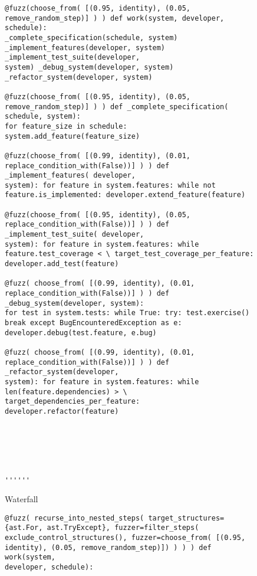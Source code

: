 \documentclass{sig-alternate}
\begin{document}
\begin{figure*}
  \centering
  
  \begin{subfigure}[b]{.45\linewidth}
\begin{lstlisting}[basicstyle=\ttfamily\scriptsize]
@fuzz(choose_from( [(0.95, identity), (0.05, remove_random_step)] ) ) def work(system, developer, schedule):
_complete_specification(schedule, system) _implement_features(developer, system) _implement_test_suite(developer,
system) _debug_system(developer, system) _refactor_system(developer, system)

@fuzz(choose_from( [(0.95, identity), (0.05, remove_random_step)] ) ) def _complete_specification( schedule, system):
for feature_size in schedule: system.add_feature(feature_size)

@fuzz(choose_from( [(0.99, identity), (0.01, replace_condition_with(False))] ) ) def _implement_features( developer,
system): for feature in system.features: while not feature.is_implemented: developer.extend_feature(feature)

@fuzz(choose_from( [(0.95, identity), (0.05, replace_condition_with(False))] ) ) def _implement_test_suite( developer,
system): for feature in system.features: while feature.test_coverage < \ target_test_coverage_per_feature:
developer.add_test(feature)

@fuzz( choose_from( [(0.99, identity), (0.01, replace_condition_with(False))] ) ) def _debug_system(developer, system):
for test in system.tests: while True: try: test.exercise() break except BugEncounteredException as e:
developer.debug(test.feature, e.bug)

@fuzz( choose_from( [(0.99, identity), (0.01, replace_condition_with(False))] ) ) def _refactor_system(developer,
system): for feature in system.features: while len(feature.dependencies) > \ target_dependencies_per_feature:
developer.refactor(feature)






''''''
\end{lstlisting}
    \caption{Waterfall}
  \end{subfigure}
  \hfill
  \begin{subfigure}[b]{.45\linewidth}
\begin{lstlisting}[basicstyle=\ttfamily\scriptsize]
@fuzz( recurse_into_nested_steps( target_structures={ast.For, ast.TryExcept}, fuzzer=filter_steps(
exclude_control_structures(), fuzzer=choose_from( [(0.95, identity), (0.05, remove_random_step)]) ) ) ) def work(system,
developer, schedule):


\end{lstlisting}
\end{subfigure}
\end{figure*}
\end{document}
